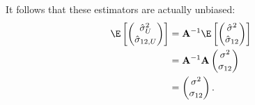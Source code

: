 \documentclass[11pt]{article}
\begin{document}
It follows that these estimators are actually unbiased:
\begin{align*}
  \E \left[
  \begin{pmatrix}
    \hat{\sigma}^2_U \\
    \hat{\sigma}_{12,U}
  \end{pmatrix}
  \right]
  &=
    \mathbf{A}^{-1}
    \E \left[
    \begin{pmatrix}
      \hat{\sigma}^2 \\
      \hat{\sigma}_{12}
    \end{pmatrix}
    \right]
  \\
  &=
    \mathbf{A}^{-1}
    \mathbf{A}
    \begin{pmatrix}
      \sigma^2 \\
      \sigma_{12}
    \end{pmatrix}
  \\
  &=
    \begin{pmatrix}
      \sigma^2 \\
      \sigma_{12}
    \end{pmatrix}
    .
\end{align*}
\end{document}
